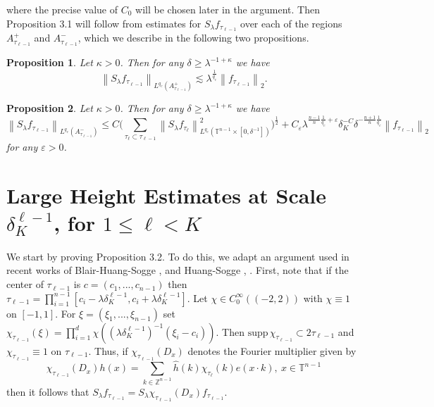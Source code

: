 \documentclass[11pt]{amsart}
\numberwithin{equation}{section}
\newcommand{\Zn}{\mathbb{Z}^{n-1}}
\newcommand{\Tn}{\mathbb{T}^{n-1}}
\newcommand{\la}{\lambda}
\newcommand\norm[1]{\left\lVert#1\right\rVert}
\newcommand{\lpnorm}[3]{\norm{#1}_{L^{#2}(#3)}}
\newcommand{\altlpnorm}[2]{\norm{#1}_{#2}}
\newcommand{\supp}[1]{\text{supp}\, #1}
\newcommand{\Sl}{S_{\la}}
\newcommand{\dK}[1]{\delta_{K}^{#1}}
\newtheorem{proposition}{Proposition}[section]
\begin{document}
\noindent
where the precise value of $C_0$ will be chosen later in the argument. Then Proposition 3.1 will follow from estimates for $\Sl f_{\tau_{\ell - 1}}$ over each of the regions $A^{+}_{\tau_{\ell - 1}}$ and $A^{-}_{\tau_{\ell - 1}}$, which we describe in the following two propositions.

\begin{proposition}
Let $\kappa  > 0$. Then for any $\delta \geq \la^{-1 + \kappa}$ we have
\begin{equation}
    \lpnorm{\Sl f_{\tau_{\ell - 1}}}{q_c}{A^{+}_{\tau_{\ell - 1}}} \lesssim \la^{\frac{1}{q_c}}\altlpnorm{f_{\tau_{\ell - 1}}}{2}.
\end{equation}
\end{proposition}

\begin{proposition}
Let $\kappa > 0$. Then for any $\delta \geq \la^{-1 + \kappa}$ we have
    \begin{equation}
        \lpnorm{\Sl f_{\tau_{\ell - 1}}}{q_c}{A^{-}_{\tau_{\ell  -1}}} \leq C\Big(\sum_{\tau_{\ell} \subset \tau_{\ell - 1}}\lpnorm{\Sl f_{\tau_{\ell}}}{q_c}{\Tn \times [0, \delta^{-1}]}^{2}\Big)^{\frac{1}{2}} + C_{\varepsilon}\la^{\frac{n-1}{n}\frac{1}{q_c}  + \varepsilon}\dK{-C}\delta^{-\frac{n+1}{n}\frac{1}{q_c}}\altlpnorm{f_{\tau_{\ell - 1}}}{2}
    \end{equation}
for any $\varepsilon > 0$.
\end{proposition}

\section{Large Height Estimates at Scale $\dK{\ell-1}$, for $1 \leq \ell < K$}

We start by proving Proposition 3.2. To do this, we adapt an argument used in recent works of Blair-Huang-Sogge \cite{BlairHuangSoggeImprovedSpectral}, \cite{BlairHuangSoggeStrichartz} and Huang-Sogge \cite{HuangSoggeStrichartz}, \cite{huang2024curvature}. First, note that if the center of $\tau_{\ell - 1}$ is $c = (c_1, ..., c_{n-1})$ then $\tau_{\ell - 1} = \prod_{i=1}^{n-1}[c_{i} - \la\dK{\ell - 1}, c_{i} + \la\dK{\ell - 1}]$. Let $\chi \in C_{0}^{\infty}((-2,2))$ with $\chi \equiv 1$ on $[-1,1]$. For $\xi = (\xi_1,...,\xi_{n-1})$ set $\chi_{\tau_{\ell-1}}(\xi) =\prod_{i = 1}^{d} \chi((\la \dK{\ell - 1})^{-1}(\xi_i - c_{i}))$. Then $\supp\chi_{\tau_{\ell - 1}} \subset 2\tau_{\ell - 1}$ and $\chi_{\tau_{\ell - 1}} \equiv 1$ on $\tau_{\ell - 1}$. Thus, if $\chi_{\tau_{\ell - 1}}(D_x)$ denotes the Fourier multiplier given by
\begin{equation}
    \chi_{\tau_{\ell - 1}}(D_x)h(x) = \sum_{k \in \Zn}\widehat{h}(k)\chi_{\tau_{\ell}}(k)e(x \cdot k), \ x \in \Tn
\end{equation}
then it follows that $\Sl f_{\tau_{\ell - 1}} = \Sl \chi_{\tau_{\ell - 1}}(D_x) f_{\tau_{\ell - 1}}$. 
\end{document}
